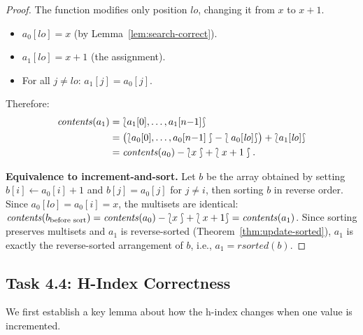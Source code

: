 \begin{proof}
The function modifies only position $\mathit{lo}$, changing it from $x$ to $x + 1$.
\begin{itemize}
  \item $a_0[\mathit{lo}] = x$ (by Lemma~\ref{lem:search-correct}).
  \item $a_1[\mathit{lo}] = x + 1$ (the assignment).
  \item For all $j \neq \mathit{lo}$: $a_1[j] = a_0[j]$.
\end{itemize}
Therefore:
\begin{align*}
  \mathit{contents}(a_1)
  &= \lbag a_1[0], \ldots, a_1[n{-}1] \rbag \\
  &= \bigl(\lbag a_0[0], \ldots, a_0[n{-}1] \rbag - \lbag a_0[\mathit{lo}] \rbag\bigr) + \lbag a_1[\mathit{lo}] \rbag \\
  &= \mathit{contents}(a_0) - \lbag x \rbag + \lbag x+1 \rbag.
\end{align*}

\textbf{Equivalence to increment-and-sort.}
Let $b$ be the array obtained by setting $b[i] \gets a_0[i] + 1$ and $b[j] = a_0[j]$
for $j \neq i$, then sorting $b$ in reverse order.
Since $a_0[\mathit{lo}] = a_0[i] = x$, the multisets are identical:
$\mathit{contents}(b_{\text{before sort}}) = \mathit{contents}(a_0) - \lbag x \rbag + \lbag x+1 \rbag = \mathit{contents}(a_1)$.
Since sorting preserves multisets and $a_1$ is reverse-sorted (Theorem~\ref{thm:update-sorted}),
$a_1$ is exactly the reverse-sorted arrangement of $b$, i.e., $a_1 = \mathit{rsorted}(b)$.
\end{proof}

\subsection{Task 4.4: H-Index Correctness}

We first establish a key lemma about how the h-index changes when one value is incremented.

